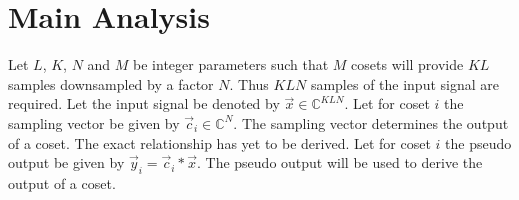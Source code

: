 \documentclass[a4paper, openany, oneside]{memoir}
\begin{document}
\section{Main Analysis}

Let $L$, $K$, $N$ and $M$ be integer parameters such that $M$ cosets will provide $KL$ samples downsampled by a factor $N$. Thus $KLN$ samples of the input signal are required. Let the input signal be denoted by $\vec{x} \in \mathbb{C}^{KLN}$. Let for coset $i$ the sampling vector be given by $\vec{c}_i \in \mathbb{C}^{N}$. The sampling vector determines the output of a coset. The exact relationship has yet to be derived. Let for coset $i$ the pseudo output be given by $\vec{y}_i = \vec{c}_i \ast \vec{x}$. The pseudo output will be used to derive the output of a coset.

\begin{blockTheorem} \label{th:conv-corr}
     \nolinebreak
\end{blockTheorem}
\end{document}
